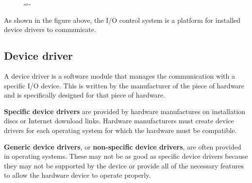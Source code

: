 \documentclass[a4paper]{systems-software}
\begin{document}
\begin{figure}[H]
  \lineskip=-\fboxrule
\end{figure}

As shown in the figure above, the I/O control system is a platform for installed device drivers to communicate.


\newpage

\subsection*{Device driver}

A device driver is a software module that manages the communication with a specific I/O device. This is written by the manufacturer of the piece of hardware and is specifically designed for that piece of hardware.

\textbf{Specific device drivers} are provided by hardware manufactures on installation discs or Internet download links. Hardware manufacturers must create device drivers for each operating system for which the hardware must be compatible.

\textbf{Generic device drivers}, or \textbf{non-specific device drivers}, are often provided in operating systems. These may not be as good as specific device drivers because they may not be supported by the device or provide all of the necessary features to allow the hardware device to operate properly.
\end{document}
